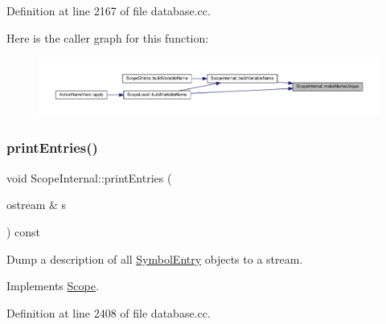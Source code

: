 Definition at line 2167 of file database.\+cc.

Here is the caller graph for this function\+:
\nopagebreak
\begin{figure}[H]
\begin{center}
\leavevmode
\includegraphics[width=350pt]{class_scope_internal_a193e6fb792e7cad6e451c8ecf2f7e589_icgraph}
\end{center}
\end{figure}
\mbox{\label{class_scope_internal_aac820e63b0d1739b9f14e15898fc9a9e}} 
\subsubsection{\texorpdfstring{printEntries()}{printEntries()}}
{\footnotesize\ttfamily void Scope\+Internal\+::print\+Entries (\begin{DoxyParamCaption}\item[{ostream \&}]{s }\end{DoxyParamCaption}) const\hspace{0.3cm}{\ttfamily [virtual]}}



Dump a description of all \mbox{\hyperlink{class_symbol_entry}{Symbol\+Entry}} objects to a stream. 



Implements \mbox{\hyperlink{class_scope_a7d67a1b9e60078023b508dd3cbe4447d}{Scope}}.



Definition at line 2408 of file database.\+cc.

